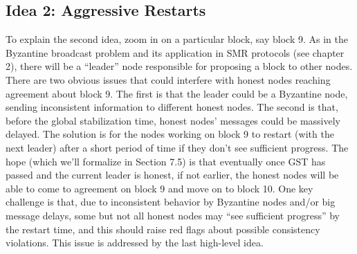 \subsection{Idea 2: Aggressive Restarts}
To explain the second idea, zoom in on a particular block, say block 9. As in the Byzantine broadcast problem and its application in SMR 
protocols (see chapter 2), there will be a “leader” node responsible for proposing a block to other nodes. There are two obvious issues 
that could interfere with honest nodes reaching agreement about block 9. The first is that the leader could be a Byzantine node, sending 
inconsistent information to different honest nodes. The second is that, before the global stabilization time, honest nodes’ messages 
could be massively delayed. The solution is for the nodes working on block 9 to restart (with the next leader) after a short period of 
time if they don’t see sufficient progress. The hope (which we’ll formalize in Section 7.5) is that eventually once GST has passed and the 
current leader is honest, if not earlier, the honest nodes will be able to come to agreement on block 9 and move on to block 10. One key 
challenge is that, due to inconsistent behavior by Byzantine nodes and/or big message delays, some but not all honest nodes may “see 
sufficient progress” by the restart time, and this should raise red flags about possible consistency violations. This issue is addressed 
by the last high-level idea.



